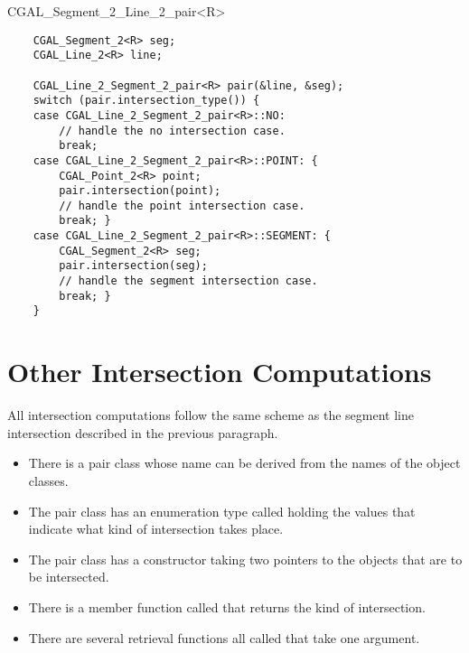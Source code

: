 \begin{classtemplate}{CGAL_Segment_2_Line_2_pair<R>}

\example

\begin{verbatim}
    CGAL_Segment_2<R> seg;
    CGAL_Line_2<R> line;

    CGAL_Line_2_Segment_2_pair<R> pair(&line, &seg);
    switch (pair.intersection_type()) {
    case CGAL_Line_2_Segment_2_pair<R>::NO:
        // handle the no intersection case.
        break;
    case CGAL_Line_2_Segment_2_pair<R>::POINT: {
        CGAL_Point_2<R> point;
        pair.intersection(point);
        // handle the point intersection case.
        break; }
    case CGAL_Line_2_Segment_2_pair<R>::SEGMENT: {
        CGAL_Segment_2<R> seg;
        pair.intersection(seg);
        // handle the segment intersection case.
        break; }
    }

\end{verbatim}

\end{classtemplate}

\section{Other Intersection Computations}

All intersection computations follow the same scheme as the segment line
intersection described in the previous paragraph.
\begin{itemize}

\item There is a pair class whose name can be derived from the names of
the object classes.
\item The pair class has an enumeration type called
holding the values that indicate
what kind of intersection takes place.
\item The pair class has a constructor taking two pointers to the objects that
are to be intersected.
\item There is a member function called  that
returns the kind of intersection.
\item There are several retrieval functions all called 
that take one argument.
\end{itemize}

